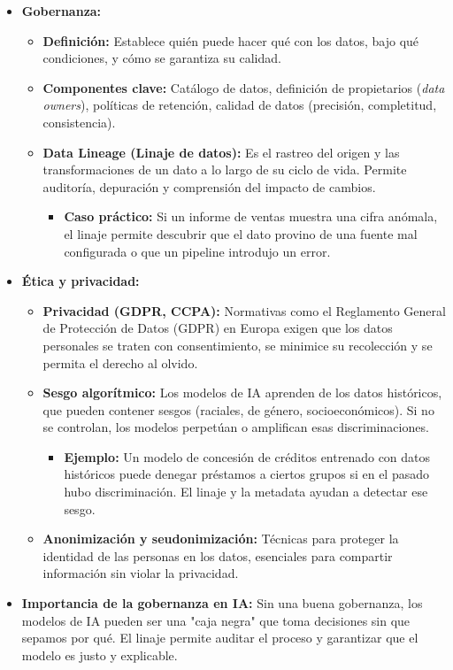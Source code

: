 \documentclass[12pt,a4paper,openany,oneside]{book}
\begin{document}
\begin{itemize}
    \item \textbf{Gobernanza:}
        \begin{itemize}
            \item \textbf{Definición:} Establece quién puede hacer qué con los datos, bajo qué condiciones, y cómo se garantiza su calidad.
            \item \textbf{Componentes clave:} Catálogo de datos, definición de propietarios (\textit{data owners}), políticas de retención, calidad de datos (precisión, completitud, consistencia).
            \item \textbf{Data Lineage (Linaje de datos):} Es el rastreo del origen y las transformaciones de un dato a lo largo de su ciclo de vida. Permite auditoría, depuración y comprensión del impacto de cambios.
                \begin{itemize}
                    \item \textbf{Caso práctico:} Si un informe de ventas muestra una cifra anómala, el linaje permite descubrir que el dato provino de una fuente mal configurada o que un pipeline introdujo un error.
                \end{itemize}
        \end{itemize}
    \item \textbf{Ética y privacidad:}
        \begin{itemize}
            \item \textbf{Privacidad (GDPR, CCPA):} Normativas como el Reglamento General de Protección de Datos (GDPR) en Europa exigen que los datos personales se traten con consentimiento, se minimice su recolección y se permita el derecho al olvido.
            \item \textbf{Sesgo algorítmico:} Los modelos de IA aprenden de los datos históricos, que pueden contener sesgos (raciales, de género, socioeconómicos). Si no se controlan, los modelos perpetúan o amplifican esas discriminaciones.
                \begin{itemize}
                    \item \textbf{Ejemplo:} Un modelo de concesión de créditos entrenado con datos históricos puede denegar préstamos a ciertos grupos si en el pasado hubo discriminación. El linaje y la metadata ayudan a detectar ese sesgo.
                \end{itemize}
            \item \textbf{Anonimización y seudonimización:} Técnicas para proteger la identidad de las personas en los datos, esenciales para compartir información sin violar la privacidad.
        \end{itemize}
    \item \textbf{Importancia de la gobernanza en IA:} Sin una buena gobernanza, los modelos de IA pueden ser una "caja negra" que toma decisiones sin que sepamos por qué. El linaje permite auditar el proceso y garantizar que el modelo es justo y explicable.
\end{itemize}
\end{document}
